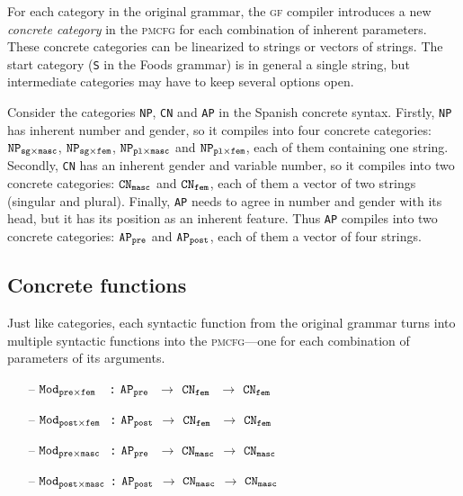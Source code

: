 \documentclass[11pt]{article}
\def\t#1{\texttt{#1}}
\def\gf{\textsc{gf}}
\def\pmcfg{\textsc{pmcfg}}
\newcommand{\quality}[1]{${\tt AP_{#1}}$}
\newcommand{\kind}[1]{${\tt CN_{#1}}$}
\newcommand{\mod}[2]{${\tt Mod_{#1\times#2}}$}
\newcommand{\itemSpa}[2]{${\tt NP_{#1\times#2}}$}
\begin{document}
For each category in the original grammar, the \gf{} compiler
introduces a new \emph{concrete category} in the \pmcfg{} for each combination of
inherent parameters.  
These concrete categories can be linearized to strings or vectors of
strings. The start category (\t{S} in the Foods grammar) is in
general a single string, but intermediate categories may have to keep
several options open. 

Consider the categories \t{NP}, \t{CN} and \t{AP} in the
Spanish concrete syntax. Firstly, \t{NP} has inherent number
and gender, so it compiles into four concrete categories:
\itemSpa{sg}{masc}, \itemSpa{sg}{fem}, \itemSpa{pl}{masc} and
\itemSpa{pl}{fem}, each of them containing one string. Secondly,
\t{CN} has an inherent gender and variable number, so it compiles into
two concrete categories: \kind{masc} and \kind{fem}, each of them a
vector of two strings (singular and plural). Finally, \t{AP} needs to
agree in number and gender with its head, but it has its position as
an inherent feature.  Thus \t{AP} compiles into two concrete
categories: \quality{pre} and \quality{post}, each of them a vector of
four strings.

\subsection{Concrete functions}
Just like categories, each syntactic function from the original
grammar turns into multiple syntactic functions into the
\pmcfg{}---one for each combination of parameters of its arguments.

\begin{itemize}
\setlength\itemsep{0em}
\item[--] \mod{pre}{fem~~} \t{:} \quality{pre~} $\rightarrow$ \kind{fem~} $\rightarrow$ \kind{fem}
\item[--]  \mod{post}{fem~} \t{:} \quality{post} $\rightarrow$ \kind{fem~} $\rightarrow$ \kind{fem}
\item[--]  \mod{pre}{masc~~}\t{:} \quality{pre~} $\rightarrow$ \kind{masc} $\rightarrow$ \kind{masc}
\item[--] \mod{post}{masc} \t{:} \quality{post} $\rightarrow$ \kind{masc} $\rightarrow$ \kind{masc}
\end{itemize}
\end{document}
